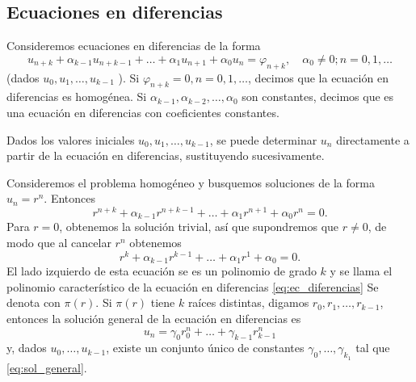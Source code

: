\documentclass[11pt,letterpaper]{report}
\renewcommand\phi\varphi
\begin{document}
\subsection{Ecuaciones en diferencias }

Consideremos ecuaciones en diferencias de la forma
\begin{equation}\label{eq:ec_diferencias}
  u_{n+k} + \alpha_{k-1}u_{n+k-1}
  + \dots +
  \alpha_1 u_{n+1}+\alpha_0u_n
  =
  \phi_{n+k},
  \quad \alpha_0 \neq 0; n=0,1,\dots
\end{equation}
(dados $u_0,u_1,\dots,u_{k-1}$ ).
Si $\phi_{n+k}=0,n=0,1,\dots$, decimos que la ecuación en diferencias
es homogénea. Si $\alpha_{k-1},\alpha_{k-2},\dots,\alpha_0$ son
constantes, decimos que es una ecuación en diferencias con
coeficientes constantes.

Dados los valores iniciales $u_0,u_1,\dots,u_{k-1}$, se puede
determinar $u_n$ directamente a partir de la ecuación en diferencias,
sustituyendo sucesivamente.

Consideremos el problema homogéneo y busquemos soluciones de la forma
$u_n=r^{n}$. Entonces
\begin{equation}
  r^{n+k} + \alpha_{k-1}r^{n+k-1}
  + \dots +
  \alpha_1 r^{n+1}+\alpha_0r^n
  =
  0.
\end{equation}
Para $r=0$, obtenemos la solución trivial, así que supondremos que
$r\neq 0$, de modo que al cancelar $r^{n}$ obtenemos
\begin{equation}
  r^{k} + \alpha_{k-1}r^{k-1}
  + \dots +
  \alpha_1 r^{1}+\alpha_0
  =
  0.
\end{equation}
El lado izquierdo de esta ecuación se es un polinomio de grado $k$ y
se llama el polinomio característico de la ecuación en diferencias
\eqref{eq:ec_diferencias} 
Se denota con $\pi(r)$.
Si $\pi(r)$ tiene $k$ raíces distintas, digamos
$r_0,r_1,\dots,r_{k-1}$, entonces la solución general de la ecuación
en diferencias es
\begin{equation}\label{eq:sol_general}
  u_n = \gamma_0r_0^{n} + \dots + \gamma_{k-1}r_{k-1}^{n}
\end{equation}
y, dados $u_0,\dots,u_{k-1}$, existe un conjunto único de constantes
$\gamma_0,\dots,\gamma_{k_1}$ tal que \eqref{eq:sol_general}.
\end{document}
